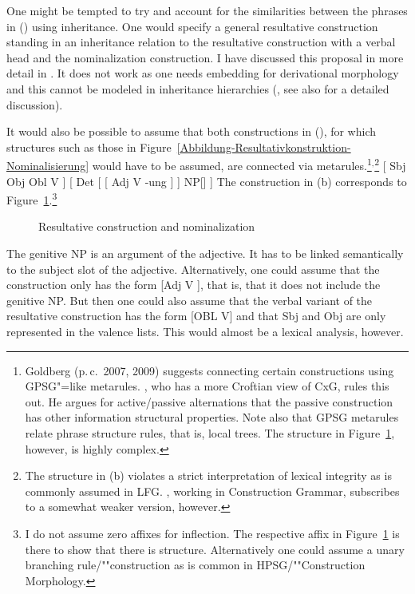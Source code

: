 One might be tempted to try and account for the similarities between the phrases in () using
inheritance. One would specify a general resultative construction standing in an inheritance relation
to the resultative construction with a verbal head and the nominalization construction. I have discussed this proposal in more detail in
. It does not work as one needs embedding for derivational morphology and this cannot be modeled
in inheritance hierarchies (, see also  for a detailed discussion).

It would also be possible to assume that both constructions  in (), for which structures such as those in
Figure~\ref{Abbildung-Resultativkonstruktion-Nominalisierung} would have to be assumed, are connected via meta\-rules.\footnote{%
  Goldberg (p.\,c.\ 2007, 2009) suggests connecting certain constructions using GPSG"=like metarules.
  \citet[]{Deppermann2006a}, who has a more Croftian view of CxG, rules this out.
 He argues for active/passive alternations that the passive construction has other information
structural properties.  Note also that GPSG metarules relate phrase
structure rules, that is, local trees. The structure in
Figure~\ref{Abbildung-Resultativkonstruktion-Nominalisierung-Construction}, however, is highly complex.
}$^,$\footnote{%
  The structure in (b) violates a strict interpretation of lexical integrity as is commonly assumed in
  LFG\indexlfg. \citet{Booij2005a,Booij2009a}, working in Construction Grammar\indexcxg, subscribes to a somewhat
  weaker version, however.%
}
\eal
\ex {}[ Sbj Obj Obl V ]
\ex {}[ Det [ [ Adj V -ung ] ] NP[] ]
\zl
The construction in (b) corresponds to
Figure~\ref{Abbildung-Resultativkonstruktion-Nominalisierung-Construction}.\footnote{%
  I do not assume zero affixes for inflection. The respective affix in
  Figure~\ref{Abbildung-Resultativkonstruktion-Nominalisierung-Construction} is there to show that
  there is structure. Alternatively one could assume a unary branching rule/""construction as is
  common in HPSG/""Construction Morphology.
}
\begin{figure}
\centering
{}
\caption{\label{Abbildung-Resultativkonstruktion-Nominalisierung-Construction}Resultative construction and nominalization}
\end{figure}%
The genitive NP is an argument of the adjective. It has to be linked semantically to the subject slot of the adjective.
Alternatively, one could assume that the construction only has the form [Adj V ], that
is, that it does not include the genitive NP. But then one could also assume that the verbal variant
of the resultative construction has the form [OBL V] and that Sbj and Obj are only represented in
the valence lists. This would almost be a lexical analysis, however.

